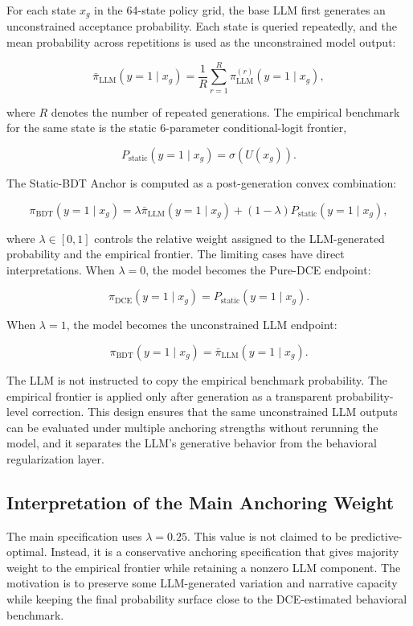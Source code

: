 \documentclass[11pt]{article}
\begin{document}
For each state \(x_g\) in the 64-state policy grid, the base LLM first generates an unconstrained acceptance probability. Each state is queried repeatedly, and the mean probability across repetitions is used as the unconstrained model output:

\[
\bar{\pi}_{\mathrm{LLM}}(y=1 \mid x_g)
=
\frac{1}{R}
\sum_{r=1}^{R}
\pi_{\mathrm{LLM}}^{(r)}(y=1 \mid x_g),
\]

where \(R\) denotes the number of repeated generations. The empirical benchmark for the same state is the static 6-parameter conditional-logit frontier,

\[
P_{\mathrm{static}}(y=1 \mid x_g)
=
\sigma(U(x_g)).
\]

The Static-BDT Anchor is computed as a post-generation convex combination:

\[
\pi_{\mathrm{BDT}}(y=1 \mid x_g)
=
\lambda \bar{\pi}_{\mathrm{LLM}}(y=1 \mid x_g)
+
(1-\lambda)P_{\mathrm{static}}(y=1 \mid x_g),
\]

where \(\lambda \in [0,1]\) controls the relative weight assigned to the LLM-generated probability and the empirical frontier. The limiting cases have direct interpretations. When \(\lambda=0\), the model becomes the Pure-DCE endpoint:

\[
\pi_{\mathrm{DCE}}(y=1 \mid x_g)
=
P_{\mathrm{static}}(y=1 \mid x_g).
\]

When \(\lambda=1\), the model becomes the unconstrained LLM endpoint:

\[
\pi_{\mathrm{BDT}}(y=1 \mid x_g)
=
\bar{\pi}_{\mathrm{LLM}}(y=1 \mid x_g).
\]

The LLM is not instructed to copy the empirical benchmark probability. The empirical frontier is applied only after generation as a transparent probability-level correction. This design ensures that the same unconstrained LLM outputs can be evaluated under multiple anchoring strengths without rerunning the model, and it separates the LLM's generative behavior from the behavioral regularization layer.

\subsection{Interpretation of the Main Anchoring Weight}

The main specification uses \(\lambda=0.25\). This value is not claimed to be predictive-optimal. Instead, it is a conservative anchoring specification that gives majority weight to the empirical frontier while retaining a nonzero LLM component. The motivation is to preserve some LLM-generated variation and narrative capacity while keeping the final probability surface close to the DCE-estimated behavioral benchmark.
\end{document}
